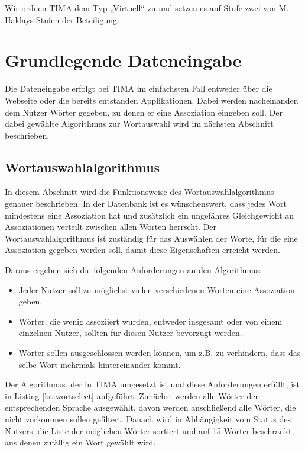 Wir ordnen TIMA dem Typ „Virtuell“ zu und setzen es auf Stufe zwei von M. Haklays Stufen der Beteiligung.

\section{Grundlegende Dateneingabe}
Die Dateneingabe erfolgt bei TIMA im einfachsten Fall entweder über die Webseite oder die bereits entstanden Applikationen. Dabei werden nacheinander, dem Nutzer Wörter gegeben, zu denen er eine Assoziation eingeben soll. Der dabei gewählte Algorithmus zur Wortauswahl wird im nächsten Abschnitt beschrieben.

\subsection{Wortauswahlalgorithmus}\label{subsec:Wortauswahlalgorithmus}
In diesem Abschnitt wird die Funktionsweise des Wortauswahlalgorithmus genauer beschrieben. In der Datenbank ist es wünschenswert, dass jedes Wort mindestens eine Assoziation hat und zusätzlich ein ungefähres Gleichgewicht an Assoziationen verteilt zwischen allen Worten herrscht. Der Wortauswahlalgorithmus ist zuständig für das Auswählen der Worte, für die eine Assoziation gegeben werden soll, damit diese Eigenschaften erreicht werden.

Daraus ergeben sich die folgenden Anforderungen an den Algorithmus:

\begin{itemize}
	\item Jeder Nutzer soll zu möglichst vielen verschiedenen Worten eine Assoziation geben.
	\item Wörter, die wenig assoziiert wurden, entweder insgesamt oder von einem einzelnen Nutzer, sollten für diesen Nutzer bevorzugt werden.
	\item Wörter sollen ausgeschlossen werden können, um z.B. zu verhindern, dass das selbe Wort mehrmals hintereinander kommt.
\end{itemize}

Der Algorithmus, der in TIMA umgesetzt ist und diese Anforderungen erfüllt, ist in \hyperref[lst:wortselect]{Listing \ref*{lst:wortselect}} aufgeführt. Zunächst werden alle Wörter der entsprechenden Sprache ausgewählt, davon werden anschließend alle Wörter, die nicht vorkommen sollen gefiltert. Danach wird in Abhängigkeit vom Status des Nutzers, die Liste der möglichen Wörter sortiert und auf 15 Wörter beschränkt, aus denen zufällig ein Wort gewählt wird.

